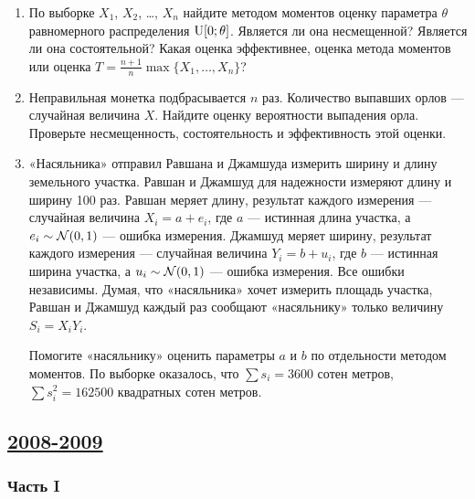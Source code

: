 \begin{enumerate}
\item По выборке $X_1$, $X_2$, \ldots, $X_n$ найдите методом моментов оценку параметра $\theta$ равномерного распределения $\mathrm{U}[0;\theta]$. Является ли она несмещенной? Является ли она состоятельной? Какая оценка эффективнее, оценка метода моментов или оценка $T=\frac{n+1}{n}\max\{X_1,\ldots,X_n\}$?
\item Неправильная монетка подбрасывается $n$ раз. Количество выпавших орлов — случайная величина $X$.  Найдите оценку вероятности выпадения орла. Проверьте несмещенность, состоятельность и эффективность этой оценки.
\item «Насяльника» отправил Равшана и Джамшуда измерить ширину и длину земельного участка. Равшан и Джамшуд для надежности измеряют длину и ширину 100 раз. Равшан меряет длину, результат каждого измерения — случайная величина $X_i=a+e_i$, где $a$ — истинная длина участка, а $e_i\sim \mathcal{N}(0,1)$ — ошибка измерения. Джамшуд меряет ширину, результат каждого измерения — случайная величина $Y_i=b+u_i$, где $b$ — истинная ширина участка, а $u_i\sim \mathcal{N}(0,1)$ — ошибка измерения. Все ошибки независимы. Думая, что «насяльника» хочет измерить площадь участка, Равшан и Джамшуд каждый раз сообщают «насяльнику» только величину $S_i = X_iY_i$.

Помогите «насяльнику» оценить параметры $a$ и $b$ по отдельности методом моментов. По выборке оказалось, что $\sum s_i=3600$ сотен метров, $\sum s_i^2 =162500$ квадратных сотен метров.
\end{enumerate}







\subsection[2008-2009]{\hyperref[sec:sol_kr_03_2008_2009]{2008-2009}}
\label{sec:kr_03_2008_2009}

\subsubsection*{Часть I}

